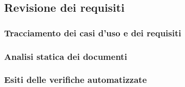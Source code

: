 \subsection{Revisione dei requisiti}
	\subsubsection{Tracciamento dei casi d'uso e dei requisiti}
	\subsubsection{Analisi statica dei documenti}
	\subsubsection{Esiti delle verifiche automatizzate}